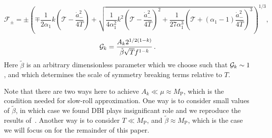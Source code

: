 \documentclass[a4paper,11pt]{article}
\begin{document}
  \begin{equation}
    \mathcal{F}_{\pm} = \pm \left(\mp\frac{1}{2\alpha_1}k \left(\mathcal{T}-\frac{{\dot{a}}_{-}^2}{4 T}\right) + \sqrt{ \frac{1}{4\alpha_1^2} k^2 \left(\mathcal{T}-\frac{{\dot{a}}_{-}^2}{4 T}\right)^2+\frac{1}{27\alpha_1^3}{\left(\mathcal{T}+\left(\alpha_1-1\right)\frac{{\dot{a}}_{-}^2}{4 T}\right)}^3}\right)^{1/3},
    \label{lag12c}
  \end{equation}
  \begin{equation}
    {\cal{G}}_k = \frac{A_k 2^{1/2 (1 - k)}}{\tilde \beta \sqrt T f^{1-k}}\,.
    \label{lag12d}
  \end{equation}
  Here $\tilde \beta$ is an arbitrary dimensionless parameter which we choose such that ${\cal{G}}_k \sim 1$, and which determines the scale of symmetry breaking terms relative to $T$.

  Note that there are two ways here to achieve $A_k \ll \mu \approx M_\text{P}$, which is the
  condition needed for slow-roll approximation.
  One way is to consider small values of $\tilde\beta$, in which case we found DBI plays
  insignificant role and we reproduce the results of~\cite{Nath:2017ihp}.
  Another way is to consider $T \ll M_\text{P}$, and $\tilde\beta \approx M_\text{P}$, which is the
  case we will focus on for the remainder of this paper.
 

\end{document}
